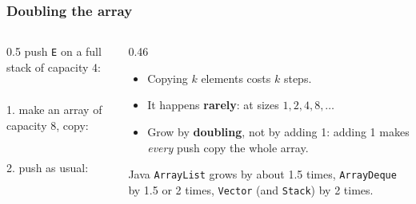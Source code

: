 \documentclass[aspectratio=169,10pt,compress]{beamer}
\begin{document}
\begin{frame}[t,fragile] \frametitle{Doubling the array}
  \begin{columns}[T]
    \begin{column}{0.5\textwidth}
      \small push \texttt{E} on a full stack of capacity 4:\\[0.2em]
      \\[0.3em]
      1. make an array of capacity 8, copy:\\[0.2em]
      \\[0.3em]
      2. push as usual:\\[0.2em]
    \end{column}
    \begin{column}{0.46\textwidth}
      \begin{itemize}\small
        \item Copying $k$ elements costs $k$ steps.
        \item It happens \textbf{rarely}: at sizes $1, 2, 4, 8, \dots$
        \item Grow by \textbf{doubling}, not by adding 1: adding 1 makes \emph{every} push copy the whole array.
      \end{itemize}
      \begin{block}{Java}
        \small \texttt{ArrayList} grows by about 1.5 times, \texttt{ArrayDeque} by 1.5 or 2 times, \texttt{Vector} (and \texttt{Stack}) by 2 times.
      \end{block}
    \end{column}
  \end{columns}
\end{frame}
\end{document}
